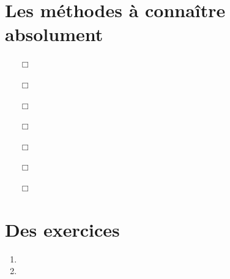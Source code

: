 \documentclass[12pt,oneside]{report}
\begin{document}
\begin{spacing}{1.2}
\begin{itemize}
\end{itemize}







\section*{Les méthodes à connaître absolument}

\begin{itemize}
\item[$\Box$] 

\item[$\Box$] 

\item[$\Box$] 

\item[$\Box$] 

\item[$\Box$] 

\item[$\Box$] 

\item[$\Box$] 

\end{itemize}






\section*{Des exercices}

\begin{enumerate}
\item 

\item 

\end{enumerate}


\end{spacing}
\end{document}
